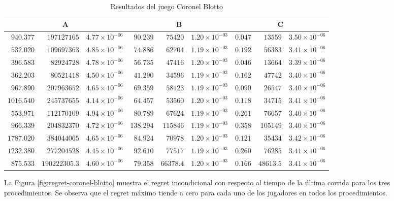 \begin{table}[hbt]
   \scriptsize
    \centering
    \begin{tabular}{r r r | r r r | r r r}
    \multicolumn{3}{c}{A} & \multicolumn{3}{c}{B} & \multicolumn{3}{c}{C} \\ \hline
	$940.377$ & $197127165$ & $4.77 {\times} 10^{-06}$ & $90.239$ & $75420$ & $1.20 {\times} 10^{-03}$ & $0.047$ & $13559$ & $3.50 {\times} 10^{-06}$ \\
	$532.020$ & $109697363$ & $4.85 {\times} 10^{-06}$ & $74.886$ & $62704$ & $1.19 {\times} 10^{-03}$ & $0.192$ & $56383$ & $3.41 {\times} 10^{-06}$ \\
	$396.583$ & $82924728$ & $4.78 {\times} 10^{-06}$ & $56.735$ & $47416$ & $1.20 {\times} 10^{-03}$ & $0.046$ & $13664$ & $3.39 {\times} 10^{-06}$ \\
	$362.203$ & $80521418$ & $4.50 {\times} 10^{-06}$ & $41.290$ & $34596$ & $1.19 {\times} 10^{-03}$ & $0.162$ & $47742$ & $3.40 {\times} 10^{-06}$ \\
	$967.890$ & $207963652$ & $4.65 {\times} 10^{-06}$ & $69.359$ & $58123$ & $1.19 {\times} 10^{-03}$ & $0.090$ & $26547$ & $3.40 {\times} 10^{-06}$ \\
	$1016.540$ & $245737655$ & $4.14 {\times} 10^{-06}$ & $64.457$ & $53560$ & $1.20 {\times} 10^{-03}$ & $0.118$ & $34715$ & $3.41 {\times} 10^{-06}$ \\
	$553.971$ & $112170109$ & $4.94 {\times} 10^{-06}$ & $80.789$ & $67624$ & $1.19 {\times} 10^{-03}$ & $0.261$ & $76657$ & $3.40 {\times} 10^{-06}$ \\
	$966.339$ & $204832370$ & $4.72 {\times} 10^{-06}$ & $138.294$ & $115846$ & $1.19 {\times} 10^{-03}$ & $0.358$ & $105149$ & $3.40 {\times} 10^{-06}$ \\
	$1787.020$ & $384044065$ & $4.65 {\times} 10^{-06}$ & $84.924$ & $70978$ & $1.20 {\times} 10^{-03}$ & $0.121$ & $35434$ & $3.42 {\times} 10^{-06}$ \\
	$1232.380$ & $277204528$ & $4.45 {\times} 10^{-06}$ & $92.610$ & $77517$ & $1.19 {\times} 10^{-03}$ & $0.260$ & $76285$ & $3.41 {\times} 10^{-06}$ \\ \hline
	$875.533$ & $190222305.3$ & $4.60 {\times} 10^{-06}$ & $79.358$ & $66378.4$ & $1.20 {\times} 10^{-03}$ & $0.166$ & $48613.5$ & $3.41 {\times} 10^{-06}$ \\ \hline
    \end{tabular}
    \caption{Resultados del juego Coronel Blotto}
    \label{tab:resultados-coronel-blotto}
\end{table}

 La Figura \ref{fig:regret-coronel-blotto} muestra el regret incondicional con respecto al tiempo de la última corrida para los tres procedimientos. Se observa que el regret máximo tiende a cero para cada uno de los jugadores en todos los procedimientos.
 
